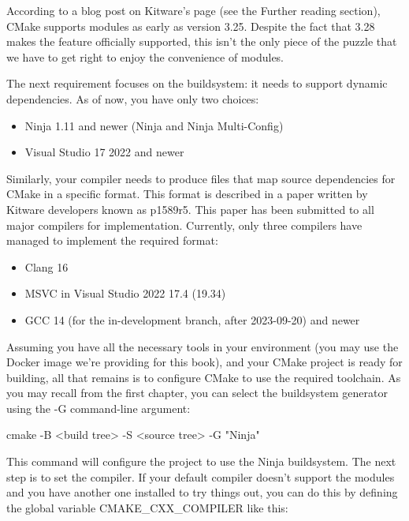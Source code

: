 
According to a blog post on Kitware’s page (see the Further reading section), CMake supports modules as early as version 3.25. Despite the fact that 3.28 makes the feature officially supported, this isn’t the only piece of the puzzle that we have to get right to enjoy the convenience of modules.

The next requirement focuses on the buildsystem: it needs to support dynamic dependencies. As of now, you have only two choices:

\begin{itemize}
\item
Ninja 1.11 and newer (Ninja and Ninja Multi-Config)

\item
Visual Studio 17 2022 and newer
\end{itemize}

Similarly, your compiler needs to produce files that map source dependencies for CMake in a specific format. This format is described in a paper written by Kitware developers known as p1589r5. This paper has been submitted to all major compilers for implementation. Currently, only three compilers have managed to implement the required format:

\begin{itemize}
\item
Clang 16

\item
MSVC in Visual Studio 2022 17.4 (19.34)

\item
GCC 14 (for the in-development branch, after 2023-09-20) and newer
\end{itemize}

Assuming you have all the necessary tools in your environment (you may use the Docker image we’re providing for this book), and your CMake project is ready for building, all that remains is to configure CMake to use the required toolchain. As you may recall from the first chapter, you can select the buildsystem generator using the -G command-line argument:

\begin{shell}
cmake -B <build tree> -S <source tree> -G "Ninja"
\end{shell}

This command will configure the project to use the Ninja buildsystem. The next step is to set the compiler. If your default compiler doesn’t support the modules and you have another one installed to try things out, you can do this by defining the global variable CMAKE\_CXX\_COMPILER like this:

